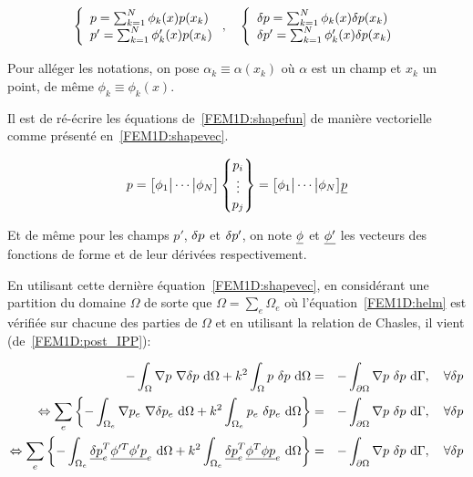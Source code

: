 \begin{equation}
	\left\{\begin{array}{l}
		p = \sum_{k=1}^N \phi_k(x)p(x_k)\\
		p' = \sum_{k=1}^N \phi_k'(x)p(x_k)\\
	\end{array}\right., \quad
	\left\{\begin{array}{l}
		\delta p = \sum_{k=1}^N \phi_k(x)\delta p(x_k)\\
		\delta p' = \sum_{k=1}^N \phi_k'(x)\delta p(x_k)\\
	\end{array}\right.\label{FEM1D:shapefun}
\end{equation}

Pour alléger les notations, on pose $\alpha_k\equiv \alpha(x_k)$ où $\alpha$ est un champ et $x_k$ un point, de même
$\phi_k\equiv\phi_k(x)$.

Il est de ré-écrire les équations de~\eqref{FEM1D:shapefun} de manière vectorielle comme présenté
en~\eqref{FEM1D:shapevec}.

\begin{equation}
        p = \big[\phi_1\big|\cdots\big|\phi_N\big]\begin{Bmatrix}p_i\\\vdots\\p_j\end{Bmatrix} =
			\big[\phi_1\big|\cdots\big|\phi_N\big]\underline{p}\label{FEM1D:shapevec}
\end{equation}

Et de même pour les champs $p'$, $\delta p$ et $\delta p'$, on note $\underline{\phi}$ et $\underline{\phi'}$ les vecteurs des fonctions de
forme et de leur dérivées respectivement.

En utilisant cette dernière équation~\eqref{FEM1D:shapevec}, en considérant une partition du domaine $\Omega$ de sorte
que $\Omega = \sum_e\Omega_e$ où l'équation~\eqref{FEM1D:helm} est vérifiée sur chacune des parties de $\Omega$ et en
utilisant la relation de Chasles, il vient (de~\eqref{FEM1D:post_IPP}):

\begin{eqnarray*}
	- \int_\Omega \nabla p~\nabla \delta p ~\mathrm{d}\Omega + k^2\int_\Omega p~\delta p~\mathrm{d}\Omega & = & -\int_{\partial\Omega}\nabla p~\delta p~\mathrm{d}\Gamma, \quad \forall\delta p\\
\Leftrightarrow \sum_e\left\{- \int_{\Omega_e} \nabla p_e~\nabla \delta p_e ~\mathrm{d}\Omega + k^2\int_{\Omega_e} p_e~\delta p_e~\mathrm{d}\Omega \right\}& = & -\int_{\partial\Omega}\nabla p~\delta p~\mathrm{d}\Gamma, \quad \forall\delta p\\
	\Leftrightarrow \sum_e\left\{- \int_{\Omega_e} \underline{\delta p}_e^T\underline{\phi'^T\phi'}\underline{p}_e~\mathrm{d}\Omega + k^2\int_{\Omega_e} \underline{\delta p}_e^T\underline{\phi^T\phi}\underline{p}_e~\mathrm{d}\Omega \right\}& = & -\int_{\partial\Omega}\nabla p~\delta p~\mathrm{d}\Gamma, \quad \forall\delta p\\
\end{eqnarray*}


